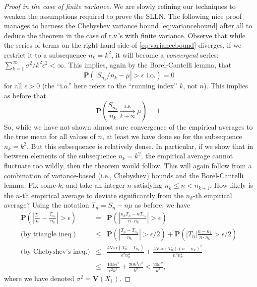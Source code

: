 \documentclass[12pt]{article}
\newcommand{\prob}{\mathbf{P}}
\newcommand{\var}{\mathbf{V}}
\theoremstyle{example}
\begin{document}
\begin{proof}[Proof in the case of finite variance] We are slowly refining our techniques to weaken the assumptions required to prove the SLLN. The following nice proof manages to harness the Chebyshev variance bound \eqref{eq:variancebound} after all to deduce the theorem in the case of r.v.'s with finite variance. Observe that while the series of terms on the right-hand side of \eqref{eq:variancebound} diverges, if we restrict it to a subsequence $n_k = k^2$, it will become a \emph{convergent} series: $\sum_{k=1}^\infty \sigma^2/k^2\epsilon^2<\infty$. This implies, again by the Borel-Cantelli lemma, that
$$ \prob(|S_{n_k}/{n_k} - \mu| > \epsilon \textrm{ i.o.}) = 0 $$
for all $\epsilon>0$ (the ``i.o.'' here refers to the ``running index'' $k$, not $n$). This implies as before that
$$ \prob\left(\frac{S_{n_k}}{n_k}\xrightarrow[k\to\infty]{\textrm{a.s.}} \mu\right) = 1. $$
So, while we have not shown almost sure convergence of the empirical averages to the true mean for all values of $n$, at least we have done so for the subsequence $n_k=k^2$. But this subsequence is relatively dense. In particular, if we show that in between elements of the subsequence $n_k=k^2$, the empirical average cannot fluctuate too wildly, then the theorem would follow. This will again follow from a combination of variance-based (i.e., Chebyshev) bounds and the Borel-Cantelli lemma. Fix some $k$, and take an integer $n$ satisfying $n_k\le n < n_{k+1}$. How likely is the $n$-th empirical average to deviate significantly from the $n_k$-th empirical average? Using the notation $T_n=S_n-n\mu$ as before, we have
\begin{eqnarray*}
\prob\left( \left| \frac{T_n}{n}-\frac{T_{n_k}}{n_k} \right| > \epsilon \right) &=& \prob\left( \left|
\frac{n_k T_n - n T_{n_k}}{n\cdot n_k} \right|>\epsilon\right)
\\ \textrm{(by triangle ineq.)}  &\le&
\prob\left( \left| \frac{T_n -T_{n_k}}{n_k} \right| > \epsilon/2 \right)+ \prob\left( \left|T_n\right| \frac{n-n_k}{n\cdot n_k}
> \epsilon/2 \right) 
\\ \textrm{(by Chebyshev's ineq.)} &\le&
\frac{4 \textrm{Var}(T_n-T_{n_k})}{\epsilon^2 n_k^2} + \frac{4\textrm{Var}(T_n)(n-n_k)^2}{n^2 n_k^2}
\\ &\le&
\frac{10 k \sigma^2}{\epsilon^2 k^4} + \frac{20 k^4 \sigma^2}{k^8} < \frac{20 \sigma^2}{k^3},
\end{eqnarray*}
where we have denoted $\sigma^2=\var(X_1)$.
 

\end{proof}
\end{document}
